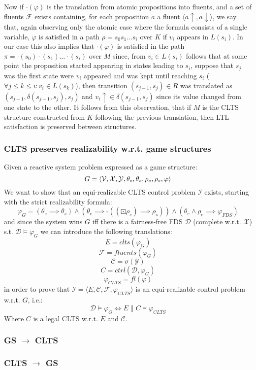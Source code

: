 Now if $\cdot(\varphi)$ is the translation from atomic propositions into fluents, and a set of fluents $\mathcal{F}$ exists containing, for each proposition $a$ a fluent $\langle a\uparrow, a\downarrow \rangle$, we say that, again observing only the atomic case where the formula consists of a single variable, $\varphi$ is satisfied in a path $\rho=s_0 s_1\ldots s_i$ over $K$ if $v_i$ appears in $L(s_i)$. In our case this also implies that $\cdot(\varphi)$ is satisfied in the path $\pi=\cdot(s_0)\cdot(s_1)\ldots \cdot(s_i)$ over $M$ since, from $v_i \in L(s_i)$ follows that at some point the proposition started appearing in states leading to $s_i$, suppose that $s_j$ was the first state were $v_i$ appeared and was kept until reaching $s_i$ ($\forall j \leq k \leq i: v_i \in L(s_k)$), then transition $(s_{j-1},s_j) \in R$ was translated as $(s_{j-1}, \delta(s_{j-1},s_j),s_j)$ and $v_i\uparrow \in \delta(s_{j-1},s_j)$ since its value changed from one state to the other. It follows from this observation, that if $M$ is the CLTS structure constructed from $K$ following the previous translation, then LTL satisfaction is preserved between structures.


\newpage
\subsubsection{CLTS preserves realizability w.r.t. game structures}
Given a reactive system problem expressed as a game structure:
\[G = \langle {\mathcal{V}}, {\mathcal{X}}, {\mathcal{Y}}, {\theta_e}, {\theta_s}, {\rho_e}, {\rho_s}, \varphi \rangle\]
We want to show that an equi-realizable CLTS control problem $\mathcal{I}$  exists, starting with the strict realizability formula:
\[\varphi_G = (\theta_e \implies \theta_s) \wedge (\theta_e \implies \square((\boxdot \rho_e) \implies \rho_s)) \wedge (\theta_e \wedge \rho_e \implies \varphi_{FDS}) \]
and since the system wins $G$ iff there is a fairness-free FDS $\mathcal{D}$ (complete w.r.t. $\mathcal{X}$) s.t. $\mathcal{D} \models \varphi_G$ we can introduce the following translations:
\[E = clts(\varphi_G)\]
\[\mathcal{F} = fluents(\varphi_G)\]
\[\mathcal{C} = \sigma(\mathcal{Y})\]
\[C= ctrl(\mathcal{D},\varphi_G)\] 
\[\varphi_{CLTS} = fl(\varphi)\]
in order to prove that $\mathcal{I} = \langle E, \mathcal{C}, \mathcal{F}, \varphi_{CLTS} \rangle$ is an equi-realizable control problem w.r.t. $G$, i.e.: 
\[\mathcal{D}\models \varphi_G \iff E \parallel C \models \varphi_{CLTS}\]
Where $C$ is a legal CLTS w.r.t. $E$ and $\mathcal{C}$.
\newpage
\subsubsection{GS $\rightarrow$ CLTS}


%

\newpage
\subsubsection{CLTS $\rightarrow$ GS}


%
\newpage

